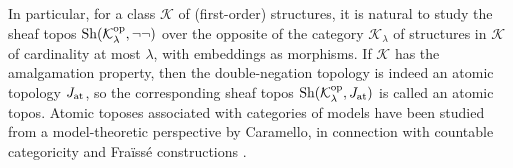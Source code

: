 \documentclass[10pt]{amsart}
\numberwithin{equation}{section}
\theoremstyle{plain}
\theoremstyle{definition}
\newcommand{\K}{\mathcal{K}}
\begin{document}

In particular, for a class $\K$ of (first-order) structures, it is natural to study the sheaf topos ${\rm Sh}(\K_\lambda^{\rm op},\neg\neg)$ over the opposite of the category $\K_\lambda$ of structures in $\K$ of cardinality at most $\lambda$, with embeddings as morphisms.
If $\mathcal{K}$ has the amalgamation property, then the double-negation topology is indeed an atomic topology $J_{\rm at}$, so the corresponding sheaf topos ${\rm Sh}(\K_\lambda^{\rm op},J_{\rm at})$ is called an atomic topos.
Atomic toposes associated with categories of models have been studied from a model-theoretic perspective by Caramello, in connection with countable categoricity and Fra\"{i}ss\'{e} constructions \cite{Car12,Car14}.
\end{document}
